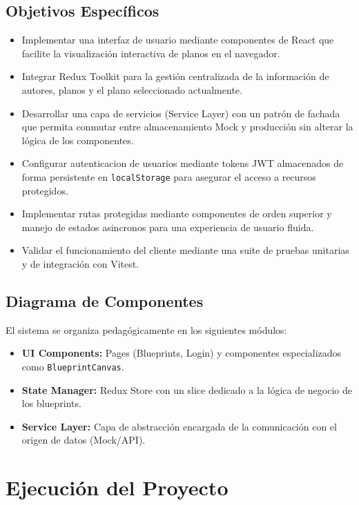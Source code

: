 \documentclass[12pt,a4paper]{article}
\begin{document}
\subsection{Objetivos Específicos}
\begin{itemize}
    \item Implementar una interfaz de usuario mediante componentes de React que facilite la visualización interactiva de planos en el navegador.
    \item Integrar Redux Toolkit para la gestión centralizada de la información de autores, planos y el plano seleccionado actualmente.
    \item Desarrollar una capa de servicios (Service Layer) con un patrón de fachada que permita conmutar entre almacenamiento Mock y producción sin alterar la lógica de los componentes.
    \item Configurar autenticacion de usuarios mediante tokens JWT almacenados de forma persistente en \texttt{localStorage} para asegurar el acceso a recursos protegidos.
    \item Implementar rutas protegidas mediante componentes de orden superior y manejo de estados asincronos para una experiencia de usuario fluida.
    \item Validar el funcionamiento del cliente mediante una suite de pruebas unitarias y de integración con Vitest.
\end{itemize}

\subsection{Diagrama de Componentes}
El sistema se organiza pedagógicamente en los siguientes módulos:
\begin{itemize}
    \item \textbf{UI Components:} Pages (Blueprints, Login) y componentes especializados como \texttt{BlueprintCanvas}.
    \item \textbf{State Manager:} Redux Store con un slice dedicado a la lógica de negocio de los blueprints.
    \item \textbf{Service Layer:} Capa de abstracción encargada de la comunicación con el origen de datos (Mock/API).
\end{itemize}

\newpage

\section{Ejecución del Proyecto}
\end{document}

